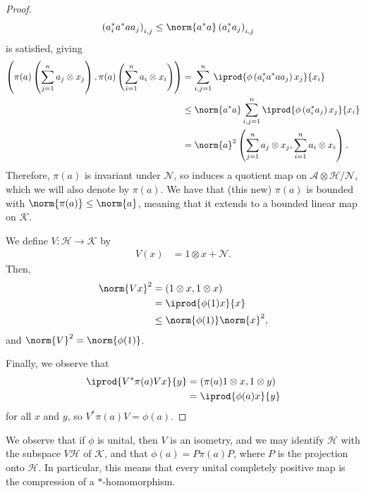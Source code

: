 \documentclass[10pt]{mypackage}
\begin{document}
\begin{proof}
  \begin{align*}
    \left( a_i^{\ast}a^{\ast}aa_j \right)_{i,j} &\leq \norm{a^{\ast}a}\left( a_i^{\ast}a_j \right)_{i,j}
  \end{align*}
  is satisfied, giving
  \begin{align*}
    \left( \pi(a)\left( \sum_{j=1}^{n}a_j\otimes x_j \right),\pi(a)\left( \sum_{i=1}^{n}a_i\otimes x_i \right) \right) &= \sum_{i,j=1}^{n} \iprod{\phi\left( a_i^{\ast}a^{\ast}aa_j \right)x_j}{x_i}\\
                                                                                                                                &\leq \norm{a^{\ast}a}\sum_{i,j=1}^{n} \iprod{\phi\left( a_i^{\ast}a_j \right)x_j}{x_i}\\
                                                                                                                                                                                                                                &= \norm{a}^2 \left( \sum_{j=1}^{n}a_j\otimes x_j,\sum_{i=1}^{n}a_i\otimes x_i \right).
  \end{align*}
  Therefore, $\pi(a)$ is invariant under $\mathcal{N}$, so induces a quotient map on $\mathcal{A}\otimes \mathcal{H}/\mathcal{N}$, which we will also denote by $\pi(a)$. We have that (this new) $\pi(a)$ is bounded with $\norm{\pi(a)}\leq \norm{a}$, meaning that it extends to a bounded linear map on $\mathcal{K}$.

  We define $V\colon \mathcal{H}\rightarrow \mathcal{K}$ by
  \begin{align*}
    V(x) &= 1\otimes x + \mathcal{N}.
  \end{align*}
  Then,
  \begin{align*}
    \norm{Vx}^2 &= \left( 1\otimes x,1\otimes x \right)\\
                &= \iprod{\phi(1)x}{x}\\
                &\leq \norm{\phi(1)}\norm{x}^2,
  \end{align*}
  and $\norm{V}^2 = \norm{\phi(1)}$.

  Finally, we observe that
  \begin{align*}
    \iprod{V^{\ast}\pi(a)Vx}{y} &= \left( \pi(a)1\otimes x,1\otimes y \right)\\
                                &= \iprod{\phi(a)x}{y}
  \end{align*}
  for all $x$ and $y$, so $V^{\ast}\pi(a)V = \phi(a)$.
\end{proof}
We observe that if $\phi$ is unital, then $V$ is an isometry, and we may identify $\mathcal{H}$ with the subspace $V\mathcal{H}$ of $\mathcal{K}$, and that $\phi(a) = P\pi(a)P$, where $P$ is the projection onto $\mathcal{H}$. In particular, this means that every unital completely positive map is the compression of a $\ast$-homomorphism.
\end{document}
